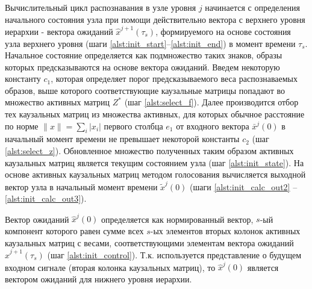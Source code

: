 \documentclass[12pt]{scrartcl}
\begin{document}
	\linespread{1}
	\begin{algorithm}[H]
		\label{alg:automato}
		\begin{algorithmic}[1]
			
		\end{algorithmic}
	\end{algorithm}
	\linespread{2}
	
	Вычислительный цикл распознавания в узле уровня $j$ начинается с определения начального состояния узла при помощи действительно вектора с верхнего уровня иерархии - вектора ожиданий $\hat x^{j+1}(\tau_s)$, формируемого на основе состояния узла верхнего уровня (шаги \ref{alst:init_start}--\ref{alst:init_end}) в момент времени $\tau_s$. Начальное состояние определяется как подмножество таких знаков, образы которых предсказываются на основе вектора ожиданий. Введем некоторую константу $c_1$, которая определяет порог предсказываемого веса распознаваемых образов, выше которого соответствующие каузальные матрицы попадают во множество активных матриц $Z^*$ (шаг \ref{alst:select_f}). Далее производится отбор тех каузальных матриц из множества активных, для которых обычное расстояние по норме $\|x\|=\sum_i |x_i|$ первого столбца $e_1$ от входного вектора $\bar x^j(0)$ в начальный момент времени не превышает некоторой константы $c_2$ (шаг \ref{alst:select_z}). Обновленное множество полученных таким образом активных каузальных матриц является текущим состоянием узла (шаг \ref{alst:init_state}). На основе активных каузальных матриц методом голосования вычисляется выходной вектор узла  в начальный момент времени $\tilde x^j(0)$ (шаги \ref{alst:init_calc_out2} -- \ref{alst:init_calc_out3}).

	Вектор ожиданий $\hat x^j(0)$ определяется как нормированный вектор, $s$-ый компонент которого равен сумме всех $s$-ых элементов вторых колонок активных каузальных матриц с весами, соответствующими элементам вектора ожиданий $\hat x^{j+1}(\tau_s)$ (шаг \ref{alst:init_control}). Т.к. используется представление о будущем входном сигнале (вторая колонка каузальных матриц), то $\hat x^j(0)$ является вектором ожиданий для нижнего уровня иерархии.

	\linespread{1}
	\begin{algorithm}[H]
		\begin{algorithmic}[1]
			\algrestore{algst:store1}
			
		\end{algorithmic}
	\end{algorithm}
	\linespread{2}
		
\end{document}
